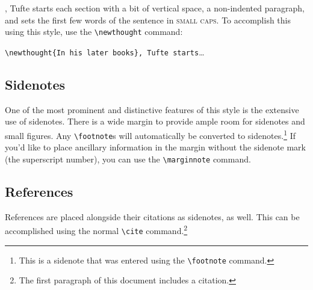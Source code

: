 \documentclass[twoside]{tufte-handout}
\begin{document}

,\cite{Tufte2006} Tufte
starts each section with a bit of vertical space, a non-indented paragraph,
and sets the first few words of the sentence in \textsc{small caps}.  To
accomplish this using this style, use the \Verb|\newthought| command:  

\Verb|\newthought{In his later books}, Tufte starts|\ldots

\subsection{Sidenotes}\label{sec:sidenotes}
One of the most prominent and distinctive features of this style is the
extensive use of sidenotes.  There is a wide margin to provide ample room
for sidenotes and small figures.  Any \Verb|\footnote|s will automatically
be converted to sidenotes.\footnote{This is a sidenote that was entered
using the \texttt{\textbackslash footnote} command.}  If you'd like to place ancillary
information in the margin without the sidenote mark (the superscript
number), you can use the \Verb|\marginnote| command.

\subsection{References}
References are placed alongside their citations as sidenotes,
as well.  This can be accomplished using the normal \Verb|\cite|
command.\footnote{The first paragraph of this document includes a citation.}
\end{document}
